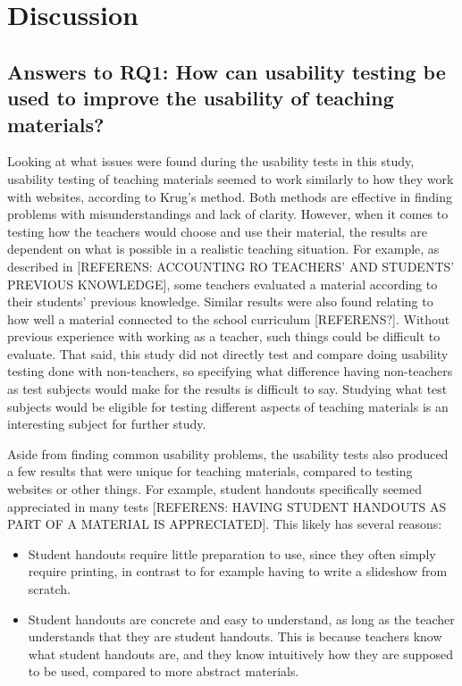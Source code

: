 \chapter{Discussion}

\section{Answers to RQ1: How can usability testing be used to improve the usability of teaching materials?}

Looking at what issues were found during the usability tests in this study, usability testing of teaching materials seemed to work similarly to how they work with websites, according to Krug's method. Both methods are effective in finding problems with misunderstandings and lack of clarity. However, when it comes to testing how the teachers would choose and use their material, the results are dependent on what is possible in a realistic teaching situation. For example, as described in [REFERENS: ACCOUNTING RO TEACHERS' AND STUDENTS' PREVIOUS KNOWLEDGE], some teachers evaluated a material according to their students' previous knowledge. Similar results were also found relating to how well a material connected to the school curriculum [REFERENS?]. Without previous experience with working as a teacher, such things could be difficult to evaluate. That said, this study did not directly test and compare doing usability testing done with non-teachers, so specifying what difference having non-teachers as test subjects would make for the results is difficult to say. Studying what test subjects would be eligible for testing different aspects of teaching materials is an interesting subject for further study.

Aside from finding common usability problems, the usability tests also produced a few results that were unique for teaching materials, compared to testing websites or other things. For example, student handouts specifically seemed appreciated in many tests [REFERENS: HAVING STUDENT HANDOUTS AS PART OF A MATERIAL IS APPRECIATED]. This likely has several reasons:

\begin{itemize}
	\item Student handouts require little preparation to use, since they often simply require printing, in contrast to for example having to write a slideshow from scratch.
	\item Student handouts are concrete and easy to understand, as long as the teacher understands that they are student handouts. This is because teachers know what student handouts are, and they know intuitively how they are supposed to be used, compared to more abstract materials.
\end{itemize}

